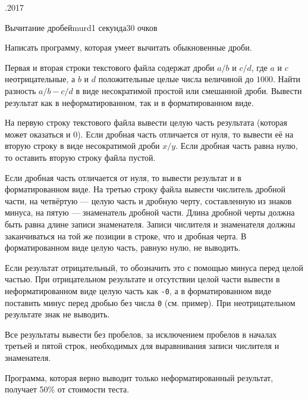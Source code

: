 \documentclass[a4paper,11pt]{article}
\begin{document}
\begin{ol}{\eio}{.2017}{\yle}{}
\begin{yl}{2}{Вычитание дробей}{murd}{1 секунда}{30 очков}

Написать программу, которая умеет вычитать обыкновенные дроби.

\sis Первая и вторая строки текстового файла \sisf содержат дроби $a/b$ и $c/d$, где $a$ и $c$ неотрицательные, а $b$ и $d$ положительные целые числа величиной до $1000$. Найти разность $a/b-c/d$ в виде несократимой простой или смешанной дроби. Вывести результат как в неформатированном, так и в форматированном виде.

\val На первую строку текстового файла \valf вывести целую часть результата (которая может оказаться и 0). Если дробная часть отличается от нуля, то вывести её на вторую строку в виде несократимой дроби $x/y$. Если дробная часть равна нулю, то оставить вторую строку файла пустой.

Если дробная часть отличается от нуля, то вывести результат и в форматированном виде. На третью строку файла вывести числитель дробной части, на четвёртую --- целую часть и дробную черту, составленную из знаков минуса, на пятую --- знаменатель дробной части. Длина дробной черты должна быть равна длине записи знаменателя. Записи числителя и знаменателя должны заканчиваться на той же позиции в строке, что и дробная черта. В форматированном виде целую часть, равную нулю, не выводить.

Если результат отрицательный, то обозначить это с помощью минуса перед целой частью. При отрицательном результате и отсутствии целой части вывести в неформатированном виде целую часть как \verb'-0', а в форматированном виде поставить минус перед дробью без числа \verb'0' (см. пример). При неотрицательном результате знак не выводить.

Все результаты вывести без пробелов, за исключением пробелов в началах третьей и пятой строк, необходимых для выравнивания записи числителя и знаменателя.

\nde[0]{3cm}{3cm}

\nde[1]{3cm}{3cm}

\nde[2]{3cm}{3cm}

\hnd Программа, которая верно выводит только неформатированный результат, получает 50\% от стоимости теста.

\end{yl}
\end{ol}
\end{document}
